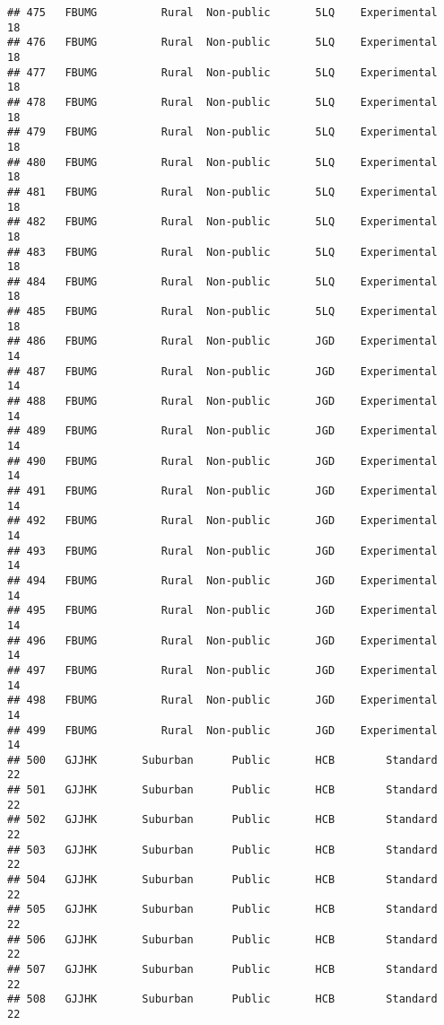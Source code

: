 \documentclass[
]{article}
\begin{document}
\begin{verbatim}
## 475   FBUMG          Rural  Non-public       5LQ    Experimental        18
## 476   FBUMG          Rural  Non-public       5LQ    Experimental        18
## 477   FBUMG          Rural  Non-public       5LQ    Experimental        18
## 478   FBUMG          Rural  Non-public       5LQ    Experimental        18
## 479   FBUMG          Rural  Non-public       5LQ    Experimental        18
## 480   FBUMG          Rural  Non-public       5LQ    Experimental        18
## 481   FBUMG          Rural  Non-public       5LQ    Experimental        18
## 482   FBUMG          Rural  Non-public       5LQ    Experimental        18
## 483   FBUMG          Rural  Non-public       5LQ    Experimental        18
## 484   FBUMG          Rural  Non-public       5LQ    Experimental        18
## 485   FBUMG          Rural  Non-public       5LQ    Experimental        18
## 486   FBUMG          Rural  Non-public       JGD    Experimental        14
## 487   FBUMG          Rural  Non-public       JGD    Experimental        14
## 488   FBUMG          Rural  Non-public       JGD    Experimental        14
## 489   FBUMG          Rural  Non-public       JGD    Experimental        14
## 490   FBUMG          Rural  Non-public       JGD    Experimental        14
## 491   FBUMG          Rural  Non-public       JGD    Experimental        14
## 492   FBUMG          Rural  Non-public       JGD    Experimental        14
## 493   FBUMG          Rural  Non-public       JGD    Experimental        14
## 494   FBUMG          Rural  Non-public       JGD    Experimental        14
## 495   FBUMG          Rural  Non-public       JGD    Experimental        14
## 496   FBUMG          Rural  Non-public       JGD    Experimental        14
## 497   FBUMG          Rural  Non-public       JGD    Experimental        14
## 498   FBUMG          Rural  Non-public       JGD    Experimental        14
## 499   FBUMG          Rural  Non-public       JGD    Experimental        14
## 500   GJJHK       Suburban      Public       HCB        Standard        22
## 501   GJJHK       Suburban      Public       HCB        Standard        22
## 502   GJJHK       Suburban      Public       HCB        Standard        22
## 503   GJJHK       Suburban      Public       HCB        Standard        22
## 504   GJJHK       Suburban      Public       HCB        Standard        22
## 505   GJJHK       Suburban      Public       HCB        Standard        22
## 506   GJJHK       Suburban      Public       HCB        Standard        22
## 507   GJJHK       Suburban      Public       HCB        Standard        22
## 508   GJJHK       Suburban      Public       HCB        Standard        22

\end{verbatim}
\end{document}

